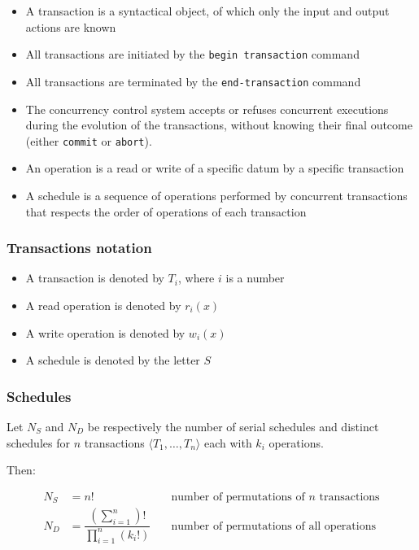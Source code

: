 \documentclass[english]{article}
\begin{document}
\begin{itemize}
  \item A transaction is a syntactical object, of which only the input and output actions are known
  \item All transactions are initiated by the \texttt{begin transaction} command
  \item All transactions are terminated by the \texttt{end-transaction} command
  \item The concurrency control system accepts or refuses concurrent executions during the evolution of the transactions, without knowing their final outcome (either \texttt{commit} or \texttt{abort}).
  \item An operation is a read or write of a specific datum by a specific transaction
  \item A schedule is a sequence of operations performed by concurrent transactions that respects the order of operations of each transaction
\end{itemize}

\subsubsection{Transactions notation}

\begin{itemize}
  \item A transaction is denoted by \(T_i\), where \(i\) is a number
  \item A read operation is denoted by \(r_i(x)\)
  \item A write operation is denoted by \(w_i(x)\)
  \item A schedule is denoted by the letter \(S\)
\end{itemize}

\subsubsection{Schedules}

Let \(N_S\) and \(N_D\) be respectively the number of serial schedules and distinct schedules for \(n\) transactions \(\langle T_1, \dots, T_n \rangle\) each with \(k_i\) operations.

Then:

\begin{align*}
  N_S & = n!                                                                                       & \quad \text{number of permutations of } n \text{ transactions} \\
  N_D & = \dfrac{\displaystyle \left(\sum_{i=1}^{n}\right)!}{\displaystyle \prod_{i=1}^{n} (k_i!)} & \quad \text{number of permutations of all operations}
\end{align*}
\end{document}
